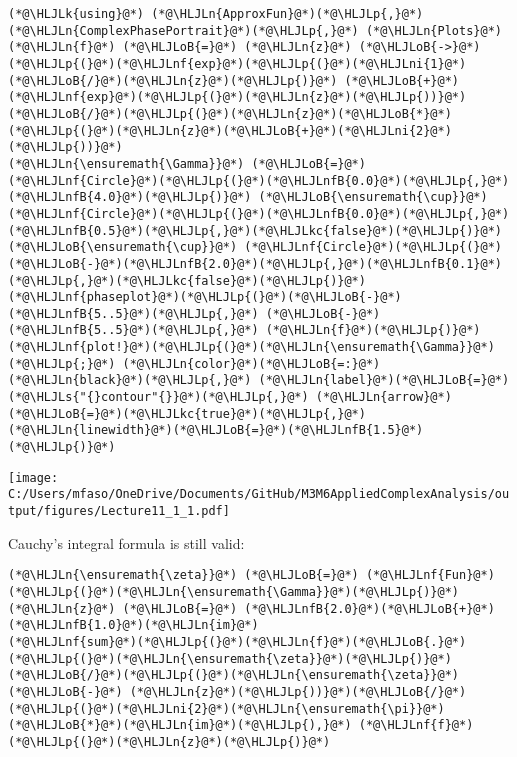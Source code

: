 \documentclass[12pt,landscape]{article}
\newcommand{\HLJLk}[1]{\textcolor[RGB]{148,91,176}{\textbf{#1}}}
\newcommand{\HLJLkc}[1]{\textcolor[RGB]{59,151,46}{\textit{#1}}}
\newcommand{\HLJLn}[1]{#1}
\newcommand{\HLJLnf}[1]{\textcolor[RGB]{66,102,213}{#1}}
\newcommand{\HLJLs}[1]{\textcolor[RGB]{201,61,57}{#1}}
\newcommand{\HLJLnfB}[1]{\textcolor[RGB]{59,151,46}{#1}}
\newcommand{\HLJLni}[1]{\textcolor[RGB]{59,151,46}{#1}}
\newcommand{\HLJLoB}[1]{\textcolor[RGB]{102,102,102}{\textbf{#1}}}
\newcommand{\HLJLp}[1]{#1}
\def\cent#1{\begin{center}#1\end{center} }
\begin{document}
{\begin{lstlisting}
(*@\HLJLk{using}@*) (*@\HLJLn{ApproxFun}@*)(*@\HLJLp{,}@*) (*@\HLJLn{ComplexPhasePortrait}@*)(*@\HLJLp{,}@*) (*@\HLJLn{Plots}@*)
(*@\HLJLn{f}@*) (*@\HLJLoB{=}@*) (*@\HLJLn{z}@*) (*@\HLJLoB{->}@*) (*@\HLJLp{(}@*)(*@\HLJLnf{exp}@*)(*@\HLJLp{(}@*)(*@\HLJLni{1}@*)(*@\HLJLoB{/}@*)(*@\HLJLn{z}@*)(*@\HLJLp{)}@*) (*@\HLJLoB{+}@*) (*@\HLJLnf{exp}@*)(*@\HLJLp{(}@*)(*@\HLJLn{z}@*)(*@\HLJLp{))}@*)(*@\HLJLoB{/}@*)(*@\HLJLp{(}@*)(*@\HLJLn{z}@*)(*@\HLJLoB{*}@*)(*@\HLJLp{(}@*)(*@\HLJLn{z}@*)(*@\HLJLoB{+}@*)(*@\HLJLni{2}@*)(*@\HLJLp{))}@*)
(*@\HLJLn{\ensuremath{\Gamma}}@*) (*@\HLJLoB{=}@*) (*@\HLJLnf{Circle}@*)(*@\HLJLp{(}@*)(*@\HLJLnfB{0.0}@*)(*@\HLJLp{,}@*) (*@\HLJLnfB{4.0}@*)(*@\HLJLp{)}@*) (*@\HLJLoB{\ensuremath{\cup}}@*) (*@\HLJLnf{Circle}@*)(*@\HLJLp{(}@*)(*@\HLJLnfB{0.0}@*)(*@\HLJLp{,}@*)(*@\HLJLnfB{0.5}@*)(*@\HLJLp{,}@*)(*@\HLJLkc{false}@*)(*@\HLJLp{)}@*) (*@\HLJLoB{\ensuremath{\cup}}@*) (*@\HLJLnf{Circle}@*)(*@\HLJLp{(}@*)(*@\HLJLoB{-}@*)(*@\HLJLnfB{2.0}@*)(*@\HLJLp{,}@*)(*@\HLJLnfB{0.1}@*)(*@\HLJLp{,}@*)(*@\HLJLkc{false}@*)(*@\HLJLp{)}@*)
(*@\HLJLnf{phaseplot}@*)(*@\HLJLp{(}@*)(*@\HLJLoB{-}@*)(*@\HLJLnfB{5..5}@*)(*@\HLJLp{,}@*) (*@\HLJLoB{-}@*)(*@\HLJLnfB{5..5}@*)(*@\HLJLp{,}@*) (*@\HLJLn{f}@*)(*@\HLJLp{)}@*)
(*@\HLJLnf{plot!}@*)(*@\HLJLp{(}@*)(*@\HLJLn{\ensuremath{\Gamma}}@*)(*@\HLJLp{;}@*) (*@\HLJLn{color}@*)(*@\HLJLoB{=:}@*)(*@\HLJLn{black}@*)(*@\HLJLp{,}@*) (*@\HLJLn{label}@*)(*@\HLJLoB{=}@*)(*@\HLJLs{"{}contour"{}}@*)(*@\HLJLp{,}@*) (*@\HLJLn{arrow}@*)(*@\HLJLoB{=}@*)(*@\HLJLkc{true}@*)(*@\HLJLp{,}@*) (*@\HLJLn{linewidth}@*)(*@\HLJLoB{=}@*)(*@\HLJLnfB{1.5}@*)(*@\HLJLp{)}@*)
\end{lstlisting}
\newpage
\cent{\texttt{[image: C:/Users/mfaso/OneDrive/Documents/GitHub/M3M6AppliedComplexAnalysis/output/figures/Lecture11\_1\_1.pdf]}}

Cauchy's integral formula is still valid:


\begin{lstlisting}
(*@\HLJLn{\ensuremath{\zeta}}@*) (*@\HLJLoB{=}@*) (*@\HLJLnf{Fun}@*)(*@\HLJLp{(}@*)(*@\HLJLn{\ensuremath{\Gamma}}@*)(*@\HLJLp{)}@*)
(*@\HLJLn{z}@*) (*@\HLJLoB{=}@*) (*@\HLJLnfB{2.0}@*)(*@\HLJLoB{+}@*)(*@\HLJLnfB{1.0}@*)(*@\HLJLn{im}@*)
(*@\HLJLnf{sum}@*)(*@\HLJLp{(}@*)(*@\HLJLn{f}@*)(*@\HLJLoB{.}@*)(*@\HLJLp{(}@*)(*@\HLJLn{\ensuremath{\zeta}}@*)(*@\HLJLp{)}@*)(*@\HLJLoB{/}@*)(*@\HLJLp{(}@*)(*@\HLJLn{\ensuremath{\zeta}}@*) (*@\HLJLoB{-}@*) (*@\HLJLn{z}@*)(*@\HLJLp{))}@*)(*@\HLJLoB{/}@*)(*@\HLJLp{(}@*)(*@\HLJLni{2}@*)(*@\HLJLn{\ensuremath{\pi}}@*)(*@\HLJLoB{*}@*)(*@\HLJLn{im}@*)(*@\HLJLp{),}@*) (*@\HLJLnf{f}@*)(*@\HLJLp{(}@*)(*@\HLJLn{z}@*)(*@\HLJLp{)}@*)
\end{lstlisting}

}
\end{document}
